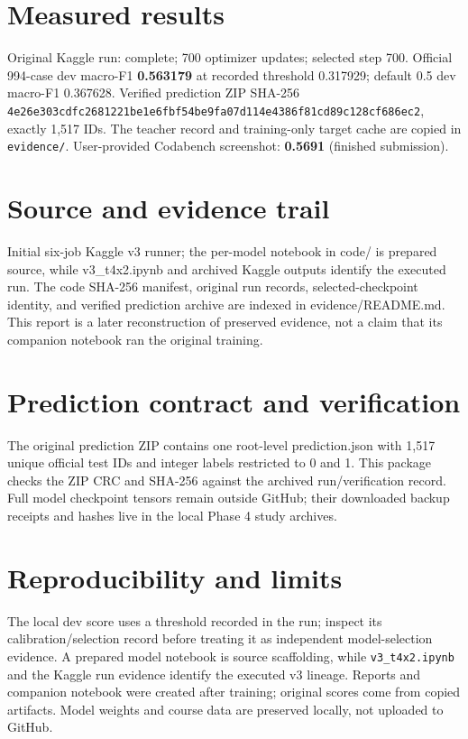 \documentclass[11pt,a4paper]{article}
\begin{document}
\section{Measured results}
Original Kaggle run: complete; 700 optimizer updates; selected step 700. Official 994-case dev macro-F1 \textbf{0.563179} at recorded threshold 0.317929; default 0.5 dev macro-F1 0.367628. Verified prediction ZIP SHA-256 \texttt{4e26e303cdfc2681221be1e6fbf54be9fa07d114e4386f81cd89c128cf686ec2}, exactly 1,517 IDs. The teacher record and training-only target cache are copied in \texttt{evidence/}. User-provided Codabench screenshot: \textbf{0.5691} (finished submission).
\section{Source and evidence trail}
Initial six-job Kaggle v3 runner; the per-model notebook in code/ is prepared source, while v3\_t4x2.ipynb and archived Kaggle outputs identify the executed run. The code SHA-256 manifest, original run records, selected-checkpoint identity, and verified prediction archive are indexed in evidence/README.md. This report is a later reconstruction of preserved evidence, not a claim that its companion notebook ran the original training.
\section{Prediction contract and verification}
The original prediction ZIP contains one root-level prediction.json with 1,517 unique official test IDs and integer labels restricted to 0 and 1. This package checks the ZIP CRC and SHA-256 against the archived run/verification record. Full model checkpoint tensors remain outside GitHub; their downloaded backup receipts and hashes live in the local Phase 4 study archives.
\section{Reproducibility and limits}
The local dev score uses a threshold recorded in the run; inspect its calibration/selection record before treating it as independent model-selection evidence. A prepared model notebook is source scaffolding, while \texttt{v3\_t4x2.ipynb} and the Kaggle run evidence identify the executed v3 lineage. Reports and companion notebook were created after training; original scores come from copied artifacts. Model weights and course data are preserved locally, not uploaded to GitHub.
\end{document}
